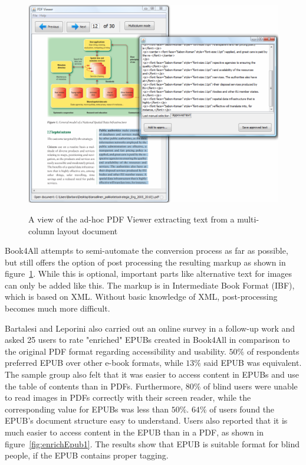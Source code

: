 \begin{figure}
	\includegraphics[width=\linewidth]{figures/book4all1.png}
	\caption{A view of the ad-hoc PDF Viewer extracting text from a multi-column layout document}\cite{book4all}
	\label{fig:book4all1}
\end{figure}

Book4All attempts to semi-automate the conversion process as far as possible, but still offers the option of post processing the resulting markup as shown in figure~\ref{fig:book4all1}. While this is optional, important parts like alternative text for images can only be added like this. The markup is in Intermediate Book Format (IBF), which is based on XML. Without basic knowledge of XML, post-processing becomes much more difficult. 

Bartalesi and Leporini \cite{enrichEPUB} also carried out an online survey in a follow-up work and asked 25 users to rate "enriched" EPUBs created in Book4All in comparison to the original PDF format regarding accessibility and usability. $50\%$ of respondents preferred EPUB over other e-book formats, while $13\%$ said EPUB was equivalent.
The sample group also felt that it was easier to access content in EPUBs and use the table of contents than in PDFs.
Furthermore, $80\%$ of blind users were unable to read images in PDFs correctly with their screen reader, while the corresponding value for EPUBs was less than $50\%$. $64\%$ of users found the EPUB's document structure easy to understand. Users also reported that it is much easier to access content in the EPUB than in a PDF, as shown in figure~\ref{fig:enrichEpub1}.  The results show that EPUB is suitable format for blind people, if the EPUB contains proper tagging. 

